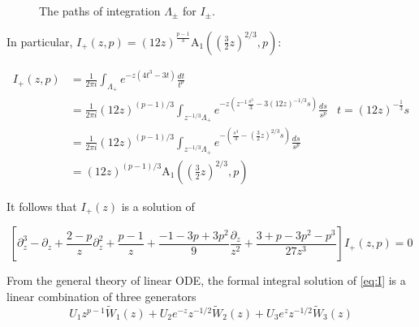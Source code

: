 \documentclass{article}
\theoremstyle{definition}
\begin{document}
\begin{figure}
\center
{}
    \caption{The paths of integration $\Lambda_\pm$ for $I_{\pm}$.}\label{fig:path-generalized-Airy-Lambda+-}
\end{figure}


In particular, $I_{+}(z,p)=(12 z)^{\tfrac{p-1}{3}}\mathrm{A}_1((\tfrac{3}{2}z)^{2/3},p)$: 

\begin{align*}
I_{+}(z,p)&=\frac{1}{2\pi i}\int_{\Lambda_{+}}e^{-z(4t^3-3t)}\frac{dt}{t^p} &\\
&=\frac{1}{2\pi i}(12 z)^{(p-1)/3}\int_{z^{-1/3}\Lambda_{+}}e^{-z(z^{-1}\frac{s^3}{3}-3 (12 z)^{-1/3}s)}\frac{ds}{s^p} & t=(12 z)^{-\tfrac{1}{3}}s\\
&=\frac{1}{2\pi i}(12 z)^{(p-1)/3}\int_{z^{-1/3}\Lambda_{+}}e^{-\left(\frac{s^3}{3}-(\tfrac{3}{2} z)^{2/3}s\right)}\frac{ds}{s^p} & \\
&=(12 z)^{(p-1)/3}\mathrm{A}_1((\tfrac{3}{2}z)^{2/3},p)
\end{align*}

It follows that $I_+(z)$ is a solution of


\begin{equation}\label{eq:I}
\left[\partial_z^3-\partial_z+\frac{2-p}{z}\partial_z^2+\frac{p-1}{z}+\frac{-1-3p+3p^2}{9}\frac{\partial_z}{z^2}+\frac{3+p-3p^2-p^3}{27z^3}\right]I_+(z,p)=0
\end{equation}

From the general theory of linear ODE, the formal integral solution of \eqref{eq:I} is a linear combination of three generators 
\begin{equation}
U_1z^{p-1}\tilde{W}_1(z)+U_2e^{-z}z^{-1/2}\tilde{W}_2(z)+U_3e^{z}z^{-1/2}\tilde{W}_3(z)
\end{equation}
 
\end{document}
